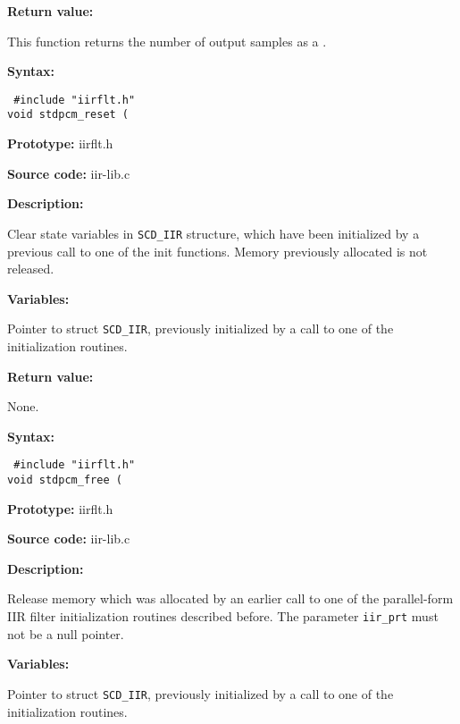 {\bf Return value: }

This function returns the number of output samples as a \long.



{\bf Syntax: }

{\tt
\#include "iirflt.h"\\
void stdpcm\_reset (
}

{\bf Prototype: }    iirflt.h

{\bf Source code: }  iir-lib.c

{\bf Description: }

Clear state variables in {\tt SCD\_IIR} structure, which have been
initialized by a previous call to one of the init functions. Memory
previously allocated is not released.

{\bf Variables: }
\begin{Descr}{\DescrLen}
\item[\pbox{20mm}{\em iir\_ptr}] %
        Pointer to struct {\tt SCD\_IIR}, previously initialized by a call to
        one of the initialization routines.
\end{Descr}

{\bf Return value: }

None.



{\bf Syntax: }

{\tt
\#include "iirflt.h"\\
void stdpcm\_free (
}

{\bf Prototype: }    iirflt.h

{\bf Source code: }  iir-lib.c

{\bf Description: }

Release memory which was allocated by an earlier call to one of
the parallel-form IIR filter initialization routines described before.
The parameter {\tt iir\_prt} must not be a null pointer.

{\bf Variables: }
\begin{Descr}{\DescrLen}
\item[\pbox{20mm}{\em iir\_ptr}] %
        Pointer to struct {\tt SCD\_IIR}, previously initialized by a call to
        one of the initialization routines.
\end{Descr}


